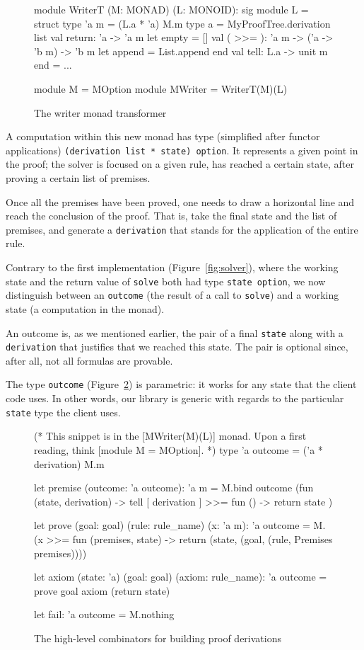 \documentclass{easychair}
\def\li{\lstinline}
\newcommand{\fref}[1]{Figure~\ref{fig:#1}}
\begin{document}
\begin{figure}
  \centering
\begin{ocaml}
module WriterT (M: MONAD) (L: MONOID): sig      module L = struct
  type 'a m = (L.a * 'a) M.m                      type a = MyProofTree.derivation list
  val return: 'a -> 'a m                          let empty = []
  val ( >>= ): 'a m -> ('a -> 'b m) -> 'b m       let append = List.append
                                                end
  val tell: L.a -> unit m
end = ...

module M = MOption
module MWriter = WriterT(M)(L)
\end{ocaml}
  \caption{The writer monad transformer}
  \label{fig:writer}
\end{figure}

A computation within this new monad has type (simplified after functor applications)
\li+(derivation list * state) option+. It represents a given point in the proof;
the solver is focused on a given rule, has reached a certain state, after
proving a certain list of premises.

Once all the premises have been proved, one needs to draw a horizontal line and
reach the conclusion of the proof. That is, take the final state and the list of
premises, and generate a \li+derivation+ that stands for the application of the
entire rule.

Contrary to the first implementation (\fref{solver}), where the working state
and the return value of \li+solve+ both had type \li+state option+, we now
distinguish between an \li+outcome+ (the result of a call to \li+solve+) and a
working state (a computation in the monad).

An outcome is, as we mentioned earlier, the pair of a final \li+state+ along
with a \li+derivation+ that justifies that we reached this state. The pair is
optional since, after all, not all formulas are provable.

The type \li+outcome+ (\fref{combinators}) is parametric: it works for any
state that the client code uses. In other words, our library is generic with
regards to the particular \li+state+ type the client uses.

\begin{figure}
  \centering
\begin{ocaml}
(* This snippet is in the [MWriter(M)(L)] monad. Upon a first reading, think
   [module M = MOption]. *)
type 'a outcome = ('a * derivation) M.m

let premise (outcome: 'a outcome): 'a m =
  M.bind outcome (fun (state, derivation) ->
    tell [ derivation ] >>= fun () ->
    return state
  )

let prove (goal: goal) (rule: rule_name) (x: 'a m): 'a outcome =
  M.(x >>= fun (premises, state) ->
    return (state, (goal, (rule, Premises premises))))

let axiom (state: 'a) (goal: goal) (axiom: rule_name): 'a outcome =
  prove goal axiom (return state)

let fail: 'a outcome =
  M.nothing
\end{ocaml}
  \caption{The high-level combinators for building proof derivations}
  \label{fig:combinators}
\end{figure}
\end{document}
